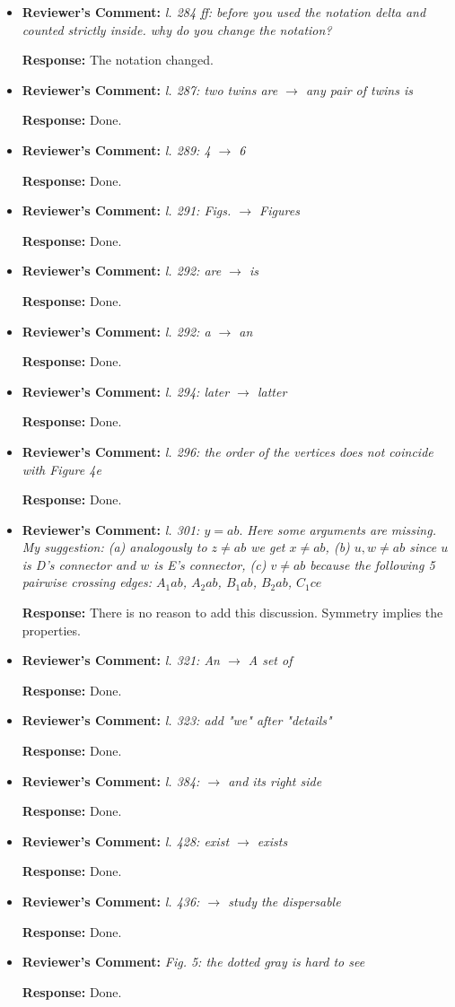 \documentclass{article}
\newcommand{\rcomment}[1]{\vspace{0.3cm} \item \textbf{Reviewer's Comment:} {\em #1}}
\newcommand{\response}{\vspace{0.2cm} \textbf{Response: }}
\begin{document}
\begin{itemize}
{\begin{itemize}
\rcomment{l. 284 ff: before you used the notation delta and counted strictly inside. why do you change the notation?}

\response{The notation changed.}

\rcomment{l. 287: two twins are $\rightarrow$ any pair of twins is}

\response{Done.}

\rcomment{l. 289: 4 $\rightarrow$ 6}

\response{Done.}

\rcomment{l. 291: Figs. $\rightarrow$ Figures}

\response{Done.}

\rcomment{l. 292: are $\rightarrow$ is}

\response{Done.}

\rcomment{l. 292: a $\rightarrow$ an}

\response{Done.}

\rcomment{l. 294: later $\rightarrow$ latter}

\response{Done.}

\rcomment{l. 296: the order of the vertices does not coincide with Figure 4e}

\response{Done.}

\rcomment{l. 301: $y = ab.$ Here some arguments are missing. My suggestion: (a) analogously to $z \neq ab$ we get $x \neq ab$, (b) $u,w \neq ab$ since $u$ is D's connector and $w$ is E's connector, (c) $v \neq ab$ because the following 5 pairwise crossing edges: $A_1 ab$, $A_2 ab$, $B_1 ab$, $B_2 ab$, $C_1 ce$}

\response{There is no reason to add this discussion. Symmetry implies the properties.}

\rcomment{l. 321: An $\rightarrow$ A set of}

\response{Done.}

\rcomment{l. 323: add "we" after "details"}

\response{Done.}

\rcomment{l. 384: $\rightarrow$ and its right side}

\response{Done.}

\rcomment{l. 428: exist $\rightarrow$ exists}

\response{Done.}

\rcomment{l. 436: $\rightarrow$ study the dispersable}

\response{Done.}

\rcomment{Fig. 5: the dotted gray is hard to see}

\response{Done.}


\end{itemize}}
\end{itemize}
\end{document}

